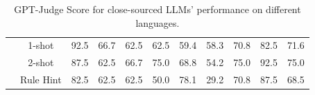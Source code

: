 \documentclass[letterpaper]{article} %
\begin{document}
\begin{table}[t]
{\begin{tabular}{lcccccccccc}
 & \cellcolor{darkpurple!25}1-shot & \cellcolor{lightpurple!25}92.5 & \cellcolor{lightpurple!25}66.7 & \cellcolor{lightpurple!25}62.5 & \cellcolor{lightpurple!25}62.5 & \cellcolor{lightpurple!25}59.4 & \cellcolor{lightpurple!25}58.3 & \cellcolor{lightpurple!25}70.8 & \cellcolor{lightpurple!25}82.5 & \cellcolor{darkpurple!25}71.6 \\
 & \cellcolor{darkpurple!25}2-shot & \cellcolor{lightpurple!25}87.5 & \cellcolor{lightpurple!25}62.5 & \cellcolor{lightpurple!25}66.7 & \cellcolor{lightpurple!25}75.0 & \cellcolor{lightpurple!25}68.8 & \cellcolor{lightpurple!25}54.2 & \cellcolor{lightpurple!25}75.0 & \cellcolor{lightpurple!25}92.5 & \cellcolor{darkpurple!25}75.0 \\
 & \cellcolor{darkpurple!25}Rule Hint & \cellcolor{lightpurple!25}82.5 & \cellcolor{lightpurple!25}62.5 & \cellcolor{lightpurple!25}62.5 & \cellcolor{lightpurple!25}50.0 & \cellcolor{lightpurple!25}78.1 & \cellcolor{lightpurple!25}29.2 & \cellcolor{lightpurple!25}70.8 & \cellcolor{lightpurple!25}87.5 & \cellcolor{darkpurple!25}68.5 \\
\bottomrule
\end{tabular}}
\caption{GPT-Judge Score for close-sourced LLMs' performance on different languages.}
\label{tab:api_on_language}
\vspace{-5mm}
\end{table}
\end{document}
